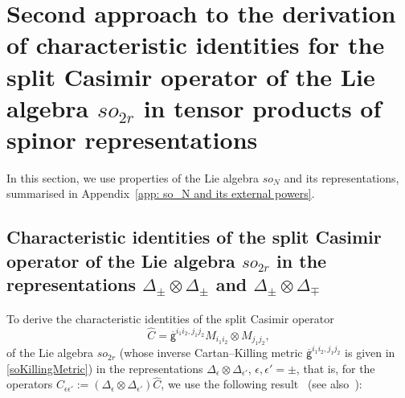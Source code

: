 \documentclass[a4paper]{article}
\newcommand{\hC}{\widehat{C}}
\renewcommand{\=}{\ =\ }
\newcommand{\okg}{\overline{\mathsf{g}}}
\numberwithin{equation}{section}
\theoremstyle{remark}
\begin{document}
\section{Second approach to the derivation of characteristic identities for the split Casimir operator of the Lie algebra $so_{2r}$ in tensor products of spinor representations}
\label{Sec: hC_ee' char idens second derivation}

In this section, we use properties of the Lie algebra $so_N$ and its representations, summarised in Appendix~\ref{app: so_N and its external powers}.

\subsection{Characteristic identities of the split Casimir operator of the Lie algebra $so_{2r}$ in the representations $\Delta_{\pm}\otimes \Delta_{\pm}$ and $\Delta_{\pm}\otimes \Delta_{\mp}$}

To derive the characteristic identities of the split Casimir operator
\begin{equation}
\hC=\okg^{i_1i_2,j_1j_2}M_{i_1i_2}\otimes M_{j_1j_2},
\end{equation}
of the Lie algebra $so_{2r}$ (whose inverse Cartan–Killing metric $\okg^{i_1i_2,j_1j_2}$ is given in \eqref{soKillingMetric}) in the representations $\Delta_\epsilon\otimes \Delta_{\epsilon'}$, $\epsilon,\epsilon'=\pm$, that is, for the operators $\hC_{\epsilon\epsilon'}:=(\Delta_\epsilon\otimes \Delta_{\epsilon'})\hC$, we use the following result~\cite{Weyl} (see also~\cite{IsRu2}):
\end{document}
